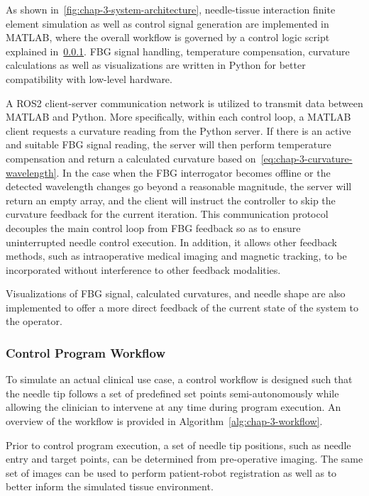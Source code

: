 As shown in~\cref{fig:chap-3-system-architecture}, needle-tissue interaction finite element simulation as well as control signal generation are implemented in MATLAB, where the overall workflow is governed by a control logic script explained in~\cref{sec:chap-3-control-program-workflow}. FBG signal handling, temperature compensation, curvature calculations as well as visualizations are written in Python for better compatibility with low-level hardware.

A ROS2 client-server communication network is utilized to transmit data between MATLAB and Python. More specifically, within each control loop, a MATLAB client requests a curvature reading from the Python server. If there is an active and suitable FBG signal reading, the server will then perform temperature compensation and return a calculated curvature based on~\cref{eq:chap-3-curvature-wavelength}. In the case when the FBG interrogator becomes offline or the detected wavelength changes go beyond a reasonable magnitude, the server will return an empty array, and the client will instruct the controller to skip the curvature feedback for the current iteration. This communication protocol decouples the main control loop from FBG feedback so as to ensure uninterrupted needle control execution. In addition, it allows other feedback methods, such as intraoperative medical imaging and magnetic tracking, to be incorporated without interference to other feedback modalities.

Visualizations of FBG signal, calculated curvatures, and needle shape are also implemented to offer a more direct feedback of the current state of the system to the operator.

\subsubsection{Control Program Workflow}
\label{sec:chap-3-control-program-workflow}
To simulate an actual clinical use case, a control workflow is designed such that the needle tip follows a set of predefined set points semi-autonomously while allowing the clinician to intervene at any time during program execution. An overview of the workflow is provided in Algorithm~\ref{alg:chap-3-workflow}.

Prior to control program execution, a set of needle tip positions, such as needle entry and target points, can be determined from pre-operative imaging. The same set of images can be used to perform patient-robot registration as well as to better inform the simulated tissue environment.

